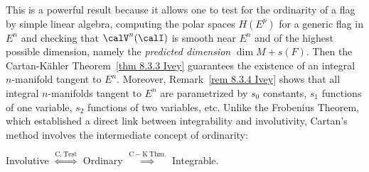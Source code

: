 This is a powerful result because it allows one to test for the ordinarity of a flag by simple linear algebra, computing the polar spaces $H(E^p)$ for a generic flag in $E^n$ and checking that $\calV^n(\calI)$ is smooth near $E^n$ and of the highest possible dimension, namely the \emph{predicted dimension} $\dim M+s(F)$. Then the Cartan-K\"ahler Theorem~\ref{thm 8.3.3 Ivey} guarantees the existence of an integral $n$-manifold tangent to $E^n$. Moreover, Remark~\ref{rem 8.3.4 Ivey} shows that all integral $n$-manifolds tangent to $E^n$ are parametrized by $s_0$ constants, $s_1$ functions of one variable, $s_2$ functions of two variables, etc. Unlike the Frobenius Theorem, which established a direct link between integrability and involutivity, Cartan's method involves the intermediate concept of ordinarity:
\begin{center}
    Involutive $\overset{\mathrm{C.~Test}}{\Leftrightarrow}$ Ordinary $\overset{\mathrm{C-K\ Thm.}}{\implies}$ Integrable.
\end{center}




